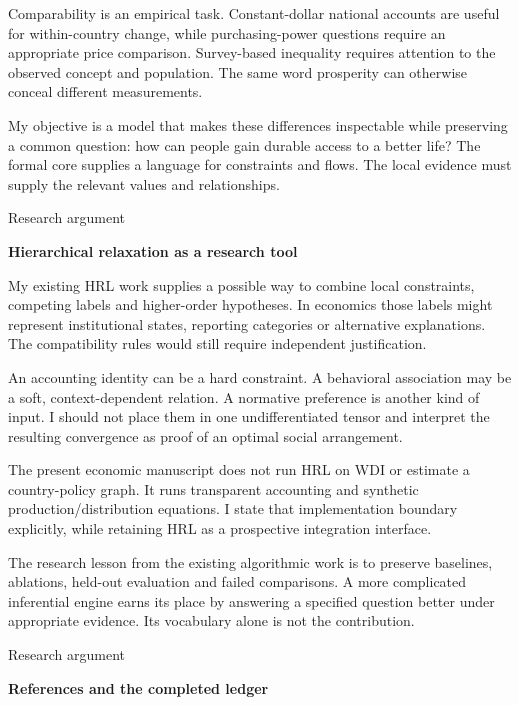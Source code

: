 \documentclass[10pt]{article}
\begin{document}
Comparability is an empirical task. Constant-dollar national accounts are useful for within-country change, while purchasing-power questions require an appropriate price comparison. Survey-based inequality requires attention to the observed concept and population. The same word prosperity can otherwise conceal different measurements.\par
My objective is a model that makes these differences inspectable while preserving a common question: how can people gain durable access to a better life? The formal core supplies a language for constraints and flows. The local evidence must supply the relevant values and relationships.\par
\clearpage
{\small\color{accent}Research argument}\par
{\LARGE\bfseries\color{ink}Hierarchical relaxation as a research tool}\par\vspace{7pt}
My existing HRL work supplies a possible way to combine local constraints, competing labels and higher-order hypotheses. In economics those labels might represent institutional states, reporting categories or alternative explanations. The compatibility rules would still require independent justification.\par
An accounting identity can be a hard constraint. A behavioral association may be a soft, context-dependent relation. A normative preference is another kind of input. I should not place them in one undifferentiated tensor and interpret the resulting convergence as proof of an optimal social arrangement.\par
The present economic manuscript does not run HRL on WDI or estimate a country-policy graph. It runs transparent accounting and synthetic production/distribution equations. I state that implementation boundary explicitly, while retaining HRL as a prospective integration interface.\par
The research lesson from the existing algorithmic work is to preserve baselines, ablations, held-out evaluation and failed comparisons. A more complicated inferential engine earns its place by answering a specified question better under appropriate evidence. Its vocabulary alone is not the contribution.\par
\clearpage
{\small\color{accent}Research argument}\par
{\LARGE\bfseries\color{ink}References and the completed ledger}\par\vspace{7pt}
\end{document}
